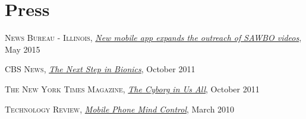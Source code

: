 
\section{\sc Press}
\textsc{News Bureau - Illinois}, \href{http://news.illinois.edu/news/15/0515SAWBO_app_BarryPittendrigh.html}{\emph{New mobile app expands the outreach of SAWBO videos}}, May 2015
\vspace*{-2.5mm}

\textsc{CBS News}, \href{http://www.cbsnews.com/stories/2011/10/09/sunday/main20117796.shtml}{\emph{The Next Step in Bionics}}, October 2011
\vspace*{-2.5mm}

\textsc{The New York Times Magazine}, \href{http://www.nytimes.com/2011/09/18/magazine/the-cyborg-in-us-all.html}{\emph{The Cyborg in Us All}}, October 2011
\vspace*{-2.5mm}

\textsc{Technology Review}, \href{http://www.technologyreview.com/blog/editors/24993/}{\emph{Mobile Phone Mind Control}}, March 2010
